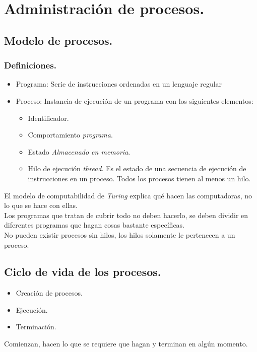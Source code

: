 \newpage
\part{Administraci\'{o}n de procesos.}

\chapter{Modelo de procesos.}

\section{Definiciones.}
\begin{itemize}
	\item Programa: Serie de instrucciones ordenadas en un lenguaje regular
	\item Proceso: Instancia de ejecuci\'{o}n de un programa con los siguientes elementos:
		\begin{itemize}
			\item Identificador.
			\item Comportamiento \textit{programa}.
			\item Estado \textit{Almacenado en memoria}.
			\item Hilo de ejecuci\'{o}n \textit{thread}. Es el estado de una secuencia de ejecuci\'{o}n de instrucciones en un proceso. Todos los procesos tienen al menos un hilo.
		\end{itemize}
\end{itemize}
El modelo de computabilidad de \textit{Turing} explica qu\'{e} hacen las computadoras, no lo que se hace con ellas.\\
Los programas que tratan de cubrir todo no deben hacerlo, se deben dividir en diferentes programas que hagan cosas bastante espec\'{i}ficas.\\
No pueden existir procesos sin hilos, los hilos solamente le pertenecen a un proceso.\\

\chapter{Ciclo de vida de los procesos.}
\begin{itemize}
	\item Creaci\'{o}n de procesos.
	\item Ejecuci\'{o}n.
	\item Terminaci\'{o}n.
\end{itemize}
Comienzan, hacen lo que se requiere que hagan y terminan en alg\'{u}n momento.


